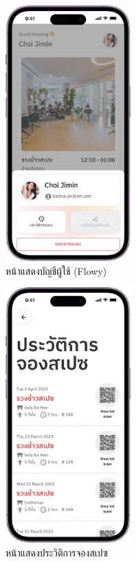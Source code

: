 \begin{figure}[ht]
    \begin{center}
    \includegraphics[width=1.9in]{./image/Flowy_account.png}
    \end{center}
    \caption[Flowy account]{หน้าแสดงบัญชีผู้ใช้ (Flowy)}
    \label{fig:Flowy_account}
\end{figure}
\begin{figure}[ht]
    \begin{center}
    \includegraphics[width=1.9in]{./image/Flowy_book_history.png}
    \end{center}
    \caption[Flowy book history]{หน้าแสดงประวิติการจองสเปซ}
    \label{fig:Flowy_book_history}
\end{figure}
